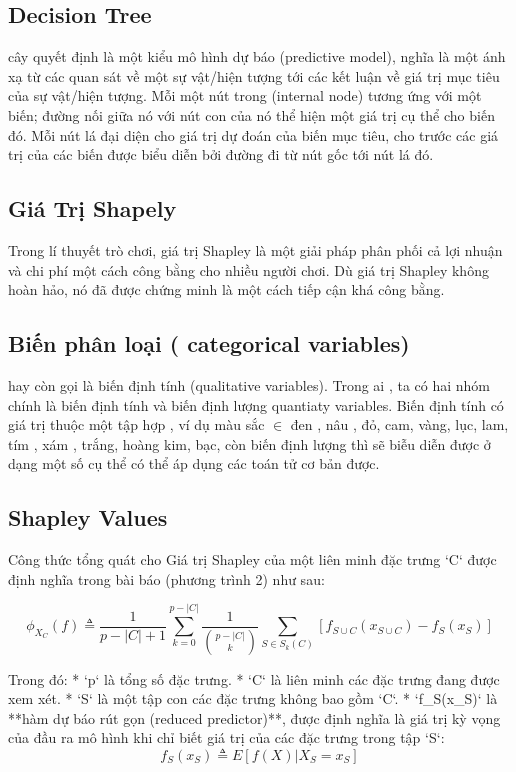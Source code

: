 \documentclass[12pt, a4paper]{article}
\begin{document}
\subsection{Decision Tree} cây quyết định là một kiểu mô hình dự báo (predictive model), nghĩa là một ánh xạ từ các quan sát về một sự vật/hiện tượng tới các kết luận về giá trị mục tiêu của sự vật/hiện tượng. Mỗi một nút trong (internal node) tương ứng với một biến; đường nối giữa nó với nút con của nó thể hiện một giá trị cụ thể cho biến đó. Mỗi nút lá đại diện cho giá trị dự đoán của biến mục tiêu, cho trước các giá trị của các biến được biểu diễn bởi đường đi từ nút gốc tới nút lá đó.
\subsection{Giá Trị Shapely} Trong lí thuyết trò chơi, giá trị Shapley là một giải pháp phân phối cả lợi nhuận và chi phí một cách công bằng cho nhiều người chơi. Dù giá trị Shapley không hoàn hảo, nó đã được chứng minh là một cách tiếp cận khá công bằng.
\subsection{Biến phân loại ( categorical variables)} hay còn gọi là biến định tính (qualitative variables). Trong ai , ta có hai nhóm chính là biến định tính và biến định lượng {quantiaty variables}. Biến định tính có giá trị thuộc một tập hợp , ví dụ màu sắc $\in$ {đen , nâu , đỏ, cam, vàng, lục, lam, tím , xám , trắng, hoàng kim, bạc}, còn biến định lượng thì sẽ biễu diễn được ở dạng một số cụ thể có thể áp dụng các toán tử cơ bản được.
\subsection{ Shapley Values} 
Công thức tổng quát cho Giá trị Shapley của một liên minh đặc trưng `C` được định nghĩa trong bài báo (phương trình 2) như sau:

$$
\phi_{X_C}(f) \triangleq \frac{1}{p - |C| + 1} \sum_{k=0}^{p-|C|} \frac{1}{\binom{p-|C|}{k}} \sum_{S \in S_k(C)} [f_{S \cup C}(x_{S \cup C}) - f_S(x_S)]
$$

Trong đó:
*   `p` là tổng số đặc trưng.
*   `C` là liên minh các đặc trưng đang được xem xét.
*   `S` là một tập con các đặc trưng không bao gồm `C`.
*   `f_S(x_S)` là **hàm dự báo rút gọn (reduced predictor)**, được định nghĩa là giá trị kỳ vọng của đầu ra mô hình khi chỉ biết giá trị của các đặc trưng trong tập `S`:
    $$
    f_S(x_S) \triangleq E[f(X) | X_S = x_S]
    $$
\end{document}
